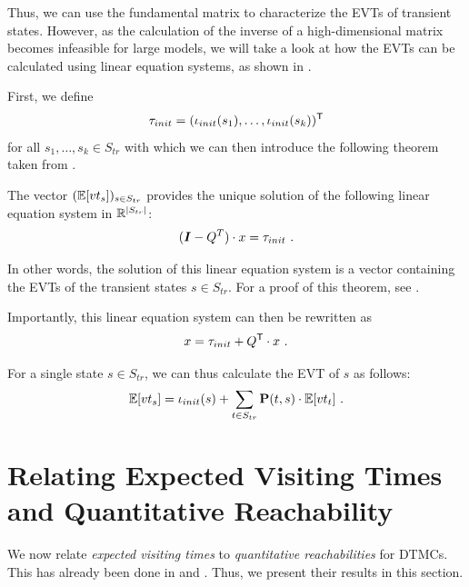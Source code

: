 Thus, we can use the fundamental matrix to characterize the EVTs of transient states. However, as the calculation of the inverse of a high-dimensional matrix becomes infeasible for large models, we will take a look at how the EVTs can be calculated using linear equation systems, as shown in \cite{KemenySnellBook,Computing_EVTs_Stationary_Distr_in_MCs_Mertens}.

First, we define 
\[\tau_{init} = (\iota_{init}(s_1),\dots,\iota_{init}(s_k))^{\mathsf{T}}\]
for all $s_1,\ldots, s_k\in S_{tr}$ with which we can then introduce the following theorem taken from \cite{Computing_EVTs_Stationary_Distr_in_MCs_Mertens}.

\begin{theorem}
    The vector $(\mathbb{E}[vt_s])_{s\in S_{tr}}$ provides the unique solution of the following linear equation system in $\mathbb{R}^{|S_{tr}|}$:
    \[(\eye - Q^T)\cdot x = \tau_{init}\ .\]
\end{theorem}
In other words, the solution of this linear equation system is a vector containing the EVTs of the transient states $s\in S_{tr}$. For a proof of this theorem, see \cite{Computing_EVTs_Stationary_Distr_in_MCs_Mertens}.

Importantly, this linear equation system can then be rewritten as 
\[x = \tau_{init} + Q^\T \cdot x\ .\]

For a single state $s\in S_{tr}$, we can thus calculate the EVT of $s$ as follows:
\begin{equation}\label{eq:EVT_DTMC_iterative_characterization}
    \mathbb{E}[vt_s] = \iota_{init}(s)+\sum_{t\in S_{tr}}\mathbf{P}(t,s)\cdot \mathbb{E}[vt_t]\ .  
\end{equation}




\section{Relating Expected Visiting Times and Quantitative Reachability}\label{sec:MC_Quantitative_Reachability}
We now relate \textit{expected visiting times} to \textit{quantitative reachabilities} for DTMCs. This has already been done in \cite[Lemma 3.5]{Baier_Relating_Reach_Prob} and \cite[Lemma 5.1]{Computing_EVTs_Stationary_Distr_in_MCs_Mertens}. Thus, we present their results in this section.

